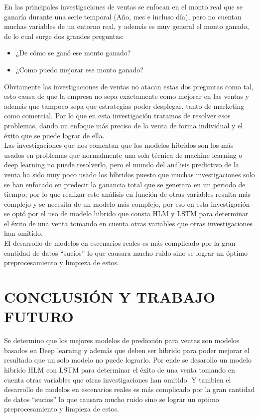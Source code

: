 \documentclass[conference]{IEEEtran}
\begin{document}
En las principales investigaciones de ventas \cite{b2}\cite{b5}\cite{b6}\cite{b1} se enfocan en el monto real que se ganaría durante una serie temporal (Año, mes e incluso día), pero no cuentan muchas variables de un entorno real, y además es muy general el monto ganado, de lo cual surge dos grandes preguntas:
\begin{itemize}
\item ¿De cómo se ganó ese monto ganado?
\item ¿Como puedo mejorar ese monto ganado?
\end{itemize}
Obviamente las investigaciones de ventas no atacan estas dos preguntas como tal, esto causa de que la empresa no sepa exactamente como mejorar en las ventas y además que tampoco sepa que estrategias poder desplegar, tanto de marketing como comercial. Por lo que en esta investigación tratamos de resolver esos problemas, dando un enfoque más preciso de la venta de forma individual y el éxito que se puede lograr de ella.\\
Las investigaciones \cite{b3}\cite{b4} que nos comentan que los modelos híbridos son los más usados en problemas que normalmente una sola técnica de machine learning o deep learning no puede resolverlo, pero el mundo del análisis predictivo de la venta ha sido muy poco usado los híbridos puesto que muchas investigaciones solo se han enfocado en predecir la ganancia total que se generara en un periodo de tiempo; por lo que realizar este análisis en función de otras variables resulta más complejo y se necesita de un modelo más complejo, por eso en esta investigación se optó por el uso de modelo hibrido que consta HLM y LSTM para determinar el éxito de una venta tomando en cuenta otras variables que otras investigaciones han omitido.\\
El desarrollo de modelos en escenarios reales es más complicado por la gran cantidad de datos “sucios” lo que causara mucho ruido sino se lograr un óptimo preprocesamiento y limpieza de estos.

\section*{CONCLUSIÓN Y TRABAJO FUTURO}
Se determino que los mejores modelos de predicción para ventas son modelos basados en Deep learning y además que deben ser hibrido para poder mejorar el resultado que un solo modelo no puede lograrlo. Por ende se desarollo un modelo hibrido HLM con LSTM para determinar el éxito de una venta tomando en cuenta otras variables que otras investigaciones han omitido. Y tambien el desarrollo de modelos en escenarios reales es más complicado por la gran cantidad de datos “sucios” lo que causara mucho ruido sino se lograr un optimo preprocesamiento y limpieza de estos.\\
\end{document}
